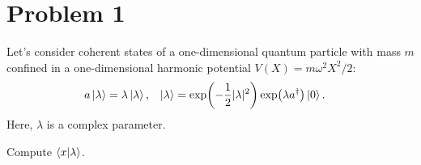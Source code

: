 \newcommand{\lam}{\lambda}
\newcommand{\blam}{\bra{\lam}}
\newcommand{\klam}{\ket{\lam}}
\newcommand{\ad}{a^\dagger}

\newcommand{\bo}{\bra{0}}
\newcommand{\ko}{\ket{0}}
\newcommand{\kn}{\ket{n}}
\newcommand{\bkxlam}{\braket{x}{\lam}}
\newcommand{\bx}{\bra{x}}

\newcommand{\ihb}{i\hbar}
\newcommand{\bkxo}{\braket{x}{0}}
\newcommand{\bkxn}{\braket{x}{n}}
\newcommand{\xo}{x_0}

\newcommand{\DA}{\Delta A}
\newcommand{\DX}{\Delta X}
\newcommand{\DP}{\Delta P}

\newcommand{\bkxbo}{\braket{x-b}{0}}
	
\section{Problem 1}
\begin{statement}
	Let's consider coherent states of a one-dimensional quantum particle with mass $m$ confined in a one-dimensional harmonic potential $V(X) = m \omega^2 X^2 / 2$:
	\begin{align*}
		a \klam &= \lam \klam, &
		\klam &= \exp(-\frac{1}{2} |\lam|^2) \exp(\lam \ad) \ko.
	\end{align*}
	Here, $\lam$ is a complex parameter.
\end{statement}

\begin{problem}
	Compute $\bkxlam$.
\end{problem}

